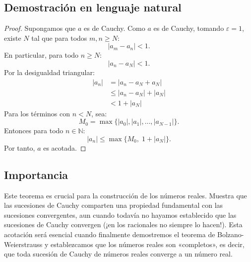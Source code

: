 \subsection{Demostración en lenguaje natural}

\begin{proof}
Supongamos que $a$ es de Cauchy. Como $a$ es de Cauchy, tomando $\varepsilon = 1$, existe $N$ tal que para todos $m, n \geq N$:
\[|a_m - a_n| < 1.\]
En particular, para todo $n \geq N$:
\[|a_n - a_N| < 1.\]
Por la desigualdad triangular:
\begin{align*}
  |a_n| &= |a_n - a_N + a_N| \\
        &\leq |a_n - a_N| + |a_N| \\
        &< 1 + |a_N|
\end{align*}
Para los términos con $n < N$, sea:
\[M_0 = \max\{|a_0|, |a_1|, \ldots, |a_{N-1}|\}.\]
Entonces para todo $n \in \mathbb{N}$:
\[|a_n| \leq \max\{M_0,\; 1 + |a_N|\}.\]
Por tanto, $a$ es acotada.
\end{proof}

\subsection{Importancia}

Este teorema es crucial para la construcción de los números reales. Muestra que las sucesiones de Cauchy comparten una propiedad fundamental con las sucesiones convergentes, aun cuando todavía no hayamos establecido que las sucesiones de Cauchy convergen (¡en los racionales no siempre lo hacen!). Esta acotación será esencial cuando finalmente demostremos el teorema de Bolzano-Weierstrauss y establezcamos que los números reales son «completos», es decir, que toda sucesión de Cauchy de números reales converge a un número real.

